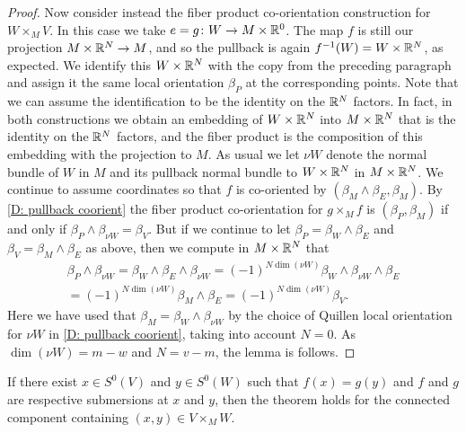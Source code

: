 \begin{proof}
	Now consider instead the fiber product co-orientation construction for $W \times_M V$.
	In this case we take $e = g \colon W \to M \times \mathbb{R}^0$.
	The map $f$ is still our projection $M \times \mathbb{R}^N \to M$, and so the pullback is again $f^{-1}(W) = W \times \mathbb{R}^N$, as expected.
	We identify this $W \times \mathbb{R}^N$ with the copy from the preceding paragraph and assign it the same local orientation $\beta_P$ at the corresponding points.
	Note that we can assume the identification to be the identity on the $\mathbb{R}^N$ factors.
	In fact, in both constructions we obtain an embedding of $W \times \mathbb{R}^N$ into $M \times \mathbb{R}^N$ that is the identity on the $\mathbb{R}^N$ factors, and the fiber product is the composition of this embedding with the projection to $M$.
	As usual we let $\nu W$ denote the normal bundle of $W$ in $M$ and its pullback normal bundle to $W \times \mathbb{R}^N$ in $M \times \mathbb{R}^N$.
	We continue to assume coordinates so that $f$ is co-oriented by $(\beta_M \wedge \beta_E, \beta_M)$.
	By \cref{D: pullback coorient} the fiber product co-orientation for $g \times_M f$ is $(\beta_P,\beta_M)$ if and only if $\beta_P \wedge \beta_{\nu W} = \beta_V$.
	But if we continue to let $\beta_P = \beta_W \wedge \beta_E$ and $\beta_V = \beta_M \wedge \beta_E$ as above, then we compute in $M \times \mathbb{R}^N$ that
	\begin{multline*}
		\beta_P \wedge \beta_{\nu W} =
		\beta_W \wedge \beta_E \wedge \beta_{\nu W} =
		(-1)^{N\dim(\nu W)} \beta_W \wedge \beta_{\nu W} \wedge \beta_E \\ =
		(-1)^{N\dim(\nu W)} \beta_M \wedge \beta_E =
		(-1)^{N\dim(\nu W)} \beta_V.
	\end{multline*}
	Here we have used that $\beta_M = \beta_W \wedge \beta_{\nu W}$ by the choice of Quillen local orientation for $\nu W$ in \cref{D: pullback coorient}, taking into account $N = 0$.
	As $\dim(\nu W) = m-w$ and $N = v-m$, the lemma is follows.
\end{proof}

\begin{lemma}\label{L: sub/sub}
	If there exist $x \in S^0(V)$ and $y \in S^0(W)$ such that $f(x) = g(y)$ and $f$ and $g$ are respective submersions at $x$ and $y$, then the theorem holds for the connected component containing $(x,y) \in V \times_M W$.
\end{lemma}

